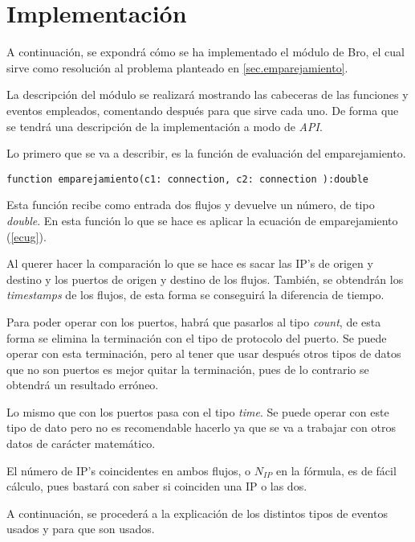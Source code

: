 \chapter{Implementación}\label{implementacion}

A continuación, se expondrá cómo se ha implementado el módulo de Bro, el cual sirve como resolución al problema planteado en 
\ref{sec.emparejamiento}.

\intro La descripción del módulo se realizará mostrando las cabeceras de las funciones y eventos empleados, comentando después para 
que sirve cada uno. De forma que se tendrá una descripción de la implementación a modo de \textit{API}.

\intro Lo primero que se va a describir, es la función de evaluación del emparejamiento.

\begin{lstlisting}[style=CodigoC]
function emparejamiento(c1: connection, c2: connection ):double 

\end{lstlisting}

\intro Esta función recibe como entrada dos flujos y devuelve un número, de tipo \textit{double}. En esta función 
lo que se hace es aplicar la ecuación de emparejamiento (\ref{ecug}).

\intro Al querer hacer la comparación lo que se hace es sacar las IP's de origen y destino y los puertos de 
origen y destino de los flujos. También, se obtendrán los \textit{timestamps} de los flujos, de esta forma se 
conseguirá la diferencia de tiempo. 

\intro Para poder operar con los puertos, habrá que pasarlos al tipo \textit{count}, de esta forma se elimina la 
terminación con el tipo de protocolo del puerto. Se puede operar con esta terminación, 
pero al tener que usar después otros tipos de datos que no son puertos es mejor quitar la terminación, pues de lo 
contrario se obtendrá un resultado erróneo. 

\intro Lo mismo que con los puertos pasa con el tipo \textit{time}. Se puede operar con este tipo de dato 
pero no es recomendable hacerlo ya que se va a trabajar con otros datos de carácter matemático.

\intro El número de IP's coincidentes en ambos flujos, o \textit{$N_{IP}$} en la fórmula, es de fácil cálculo, pues bastará con saber si 
coinciden una IP o las dos.

\intro A continuación, se procederá a la explicación de los distintos tipos de eventos usados y para que son usados.

